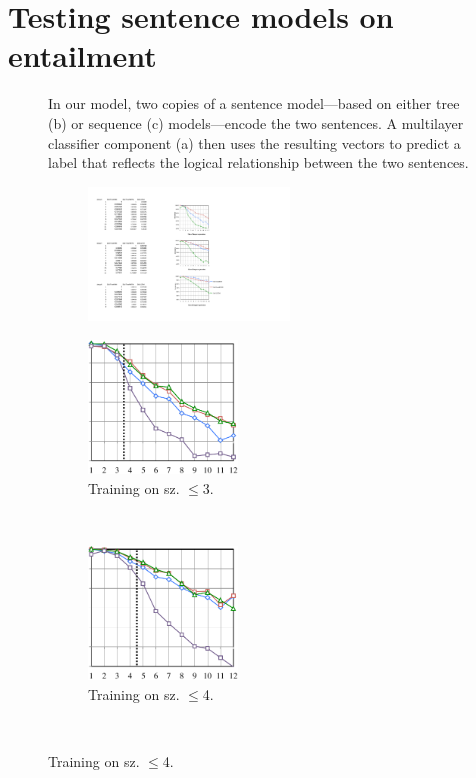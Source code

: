 \section{Testing sentence models on entailment} \label{methods}

\begin{figure}[t]
  \centering
  
  \caption{In our model, two copies of a sentence model---based on either tree (b) or sequence (c) models---encode the two sentences. A multilayer classifier component (a) then uses the resulting vectors to predict a label that reflects the logical relationship between the two sentences.}
  \label{sample-figure}
\end{figure}

\begin{figure}[t]
  \centering
  \begin{subfigure}[t]{0.04\textwidth}
      \includegraphics[height=1.4in]{scale.pdf}
\end{subfigure}
\begin{subfigure}[t]{0.24\textwidth}
  \includegraphics[height=1.4in]{fig3c.pdf}
  \caption{Training on sz. $\le$3.}
  \end{subfigure}~~~~
\begin{subfigure}[t]{0.24\textwidth}
    \includegraphics[height=1.4in]{fig4c.pdf}
  \caption{Training on sz. $\le$4.}
  \end{subfigure}~~~~

\end{figure}
